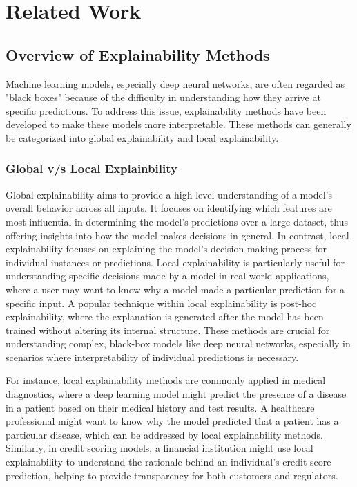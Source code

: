 \section{Related Work}
\subsection{Overview of Explainability Methods}
Machine learning models, especially deep neural networks, are often regarded as "black boxes" because of the difficulty in understanding how they arrive at specific predictions. To address this issue, explainability methods have been developed to make these models more interpretable. These methods can generally be categorized into global explainability and local explainability.

\subsubsection{Global v/s Local Explainbility}

Global explainability aims to provide a high-level understanding of a model’s overall behavior across all inputs. It focuses on identifying which features are most influential in determining the model's predictions over a large dataset, thus offering insights into how the model makes decisions in general. In contrast, local explainability focuses on explaining the model’s decision-making process for individual instances or predictions. Local explainability is particularly useful for understanding specific decisions made by a model in real-world applications, where a user may want to know why a model made a particular prediction for a specific input. A popular technique within local explainability is post-hoc explainability, where the explanation is generated after the model has been trained without altering its internal structure. These methods are crucial for understanding complex, black-box models like deep neural networks, especially in scenarios where interpretability of individual predictions is necessary.

For instance, local explainability methods are commonly applied in medical diagnostics, where a deep learning model might predict the presence of a disease in a patient based on their medical history and test results. A healthcare professional might want to know why the model predicted that a patient has a particular disease, which can be addressed by local explainability methods. Similarly, in credit scoring models, a financial institution might use local explainability to understand the rationale behind an individual's credit score prediction, helping to provide transparency for both customers and regulators.

